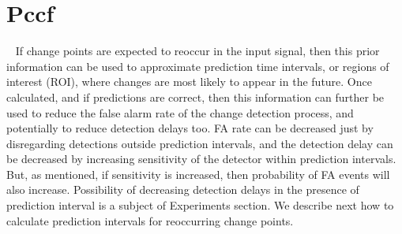\section{Pccf}~\label{sec:pccf}
If change points are expected to reoccur in the input signal, then this prior information can be used to approximate prediction time intervals, or regions of interest (ROI), where changes are most likely to appear in the future.
Once calculated, and if predictions are correct, then this information can further be used to reduce the false alarm rate of the change detection process, %
and potentially to reduce detection delays too.
FA rate can be decreased just by disregarding detections outside prediction intervals, and the detection delay can be decreased by increasing sensitivity of the detector within prediction intervals.
But, as mentioned, if sensitivity is increased, then probability of FA events will also  increase.
Possibility of decreasing detection delays in the presence of prediction interval is a subject of Experiments section.
We describe next how to calculate prediction intervals for reoccurring change points.

